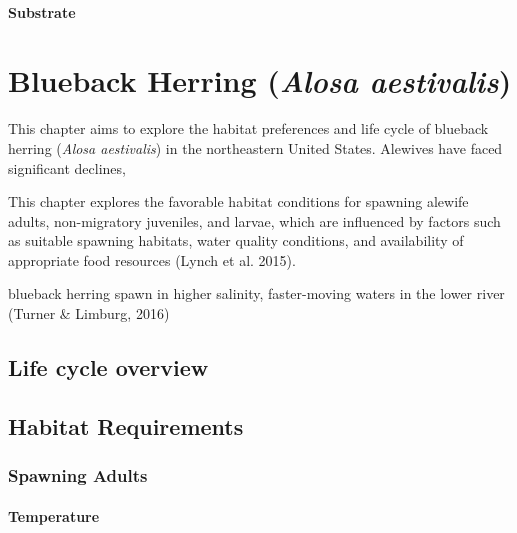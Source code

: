 \documentclass[
]{book}
\begin{document}
\hypertarget{substrate-5}{%
\subsubsection{Substrate}\label{substrate-5}}

\hypertarget{blueback-herring-alosa-aestivalis}{%
\chapter{\texorpdfstring{Blueback Herring (\emph{Alosa aestivalis})}{Blueback Herring (Alosa aestivalis)}}\label{blueback-herring-alosa-aestivalis}}

This chapter aims to explore the habitat preferences and life cycle of blueback herring (\emph{Alosa aestivalis}) in the northeastern United States.
Alewives have faced significant declines,

This chapter explores the favorable habitat conditions for spawning alewife adults, non-migratory juveniles, and larvae, which are influenced by factors such as suitable spawning habitats, water quality conditions, and availability of appropriate food resources (Lynch et al. 2015).

blueback herring spawn in higher salinity, faster-moving waters in the lower river (Turner \& Limburg, 2016)

\hypertarget{life-cycle-overview-1}{%
\section{Life cycle overview}\label{life-cycle-overview-1}}

\hypertarget{habitat-requirements-1}{%
\section{Habitat Requirements}\label{habitat-requirements-1}}

\hypertarget{spawning-adults}{%
\subsection{Spawning Adults}\label{spawning-adults}}

\hypertarget{temperature-6}{%
\subsubsection{Temperature}\label{temperature-6}}
\end{document}
